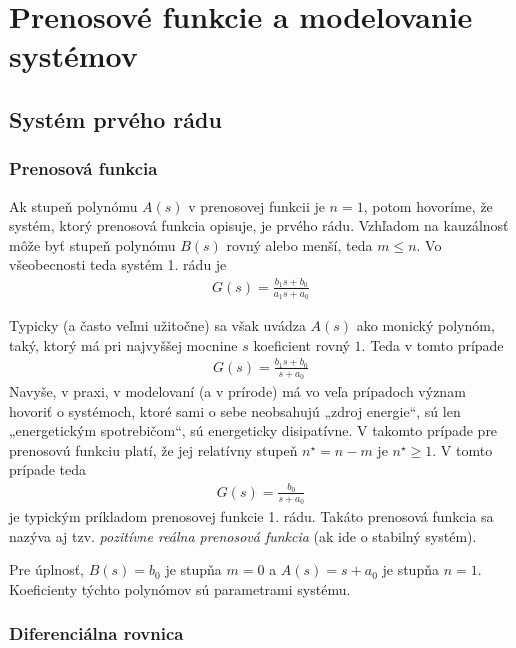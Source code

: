 \documentclass[a4paper, 10pt, ]{article}
\begin{document}
\section{Prenosové funkcie a modelovanie systémov}




\subsection{Systém prvého rádu}


\subsubsection{Prenosová funkcia}


Ak stupeň polynómu $A(s)$ v prenosovej funkcii je $n = 1$, potom hovoríme, že systém, ktorý prenosová funkcia opisuje, je prvého rádu. Vzhľadom na kauzálnosť môže byť stupeň polynómu $B(s)$ rovný alebo menší, teda $m \leq n$. Vo všeobecnosti teda systém 1. rádu je
\begin{align}
    G(s) = \frac{b_1 s + b_0}{a_1 s + a_0}
\end{align}

Typicky (a často veľmi užitočne) sa však uvádza $A(s)$ ako monický polynóm, taký, ktorý má pri najvyššej mocnine $s$ koeficient rovný $1$. Teda v tomto prípade
\begin{align}
    G(s) = \frac{b_1 s + b_0}{s + a_0}
\end{align}
Navyše, v praxi, v modelovaní (a v prírode) má vo veľa prípadoch význam hovoriť o systémoch, ktoré sami o sebe neobsahujú „zdroj energie“, sú len „energetickým spotrebičom“, sú energeticky disipatívne. V takomto prípade pre prenosovú funkciu platí, že jej relatívny stupeň $n^\star = n-m$ je $n^\star \geq 1$. V tomto prípade teda
\begin{align} \label{eq:prvyradprenosovafunkcia}
    G(s) = \frac{b_0}{s + a_0}
\end{align}
je typickým príkladom prenosovej funkcie 1. rádu. Takáto prenosová funkcia sa nazýva aj tzv. \emph{pozitívne reálna prenosová funkcia} (ak ide o stabilný systém).

Pre úplnosť, $B(s) = b_0$ je stupňa $m=0$ a $A(s) = s + a_0$ je stupňa $n=1$. Koeficienty týchto polynómov sú parametrami systému.









\subsubsection{Diferenciálna rovnica}
\end{document}
